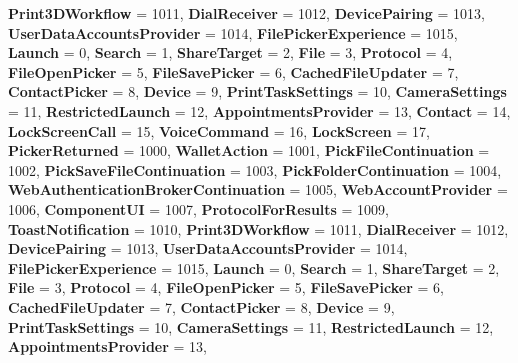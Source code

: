 \begin{DoxyCompactItemize}
\newline
{\bfseries Print3\+D\+Workflow} = 1011, 
{\bfseries Dial\+Receiver} = 1012, 
{\bfseries Device\+Pairing} = 1013, 
{\bfseries User\+Data\+Accounts\+Provider} = 1014, 
\newline
{\bfseries File\+Picker\+Experience} = 1015, 
{\bfseries Launch} = 0, 
{\bfseries Search} = 1, 
{\bfseries Share\+Target} = 2, 
\newline
{\bfseries File} = 3, 
{\bfseries Protocol} = 4, 
{\bfseries File\+Open\+Picker} = 5, 
{\bfseries File\+Save\+Picker} = 6, 
\newline
{\bfseries Cached\+File\+Updater} = 7, 
{\bfseries Contact\+Picker} = 8, 
{\bfseries Device} = 9, 
{\bfseries Print\+Task\+Settings} = 10, 
\newline
{\bfseries Camera\+Settings} = 11, 
{\bfseries Restricted\+Launch} = 12, 
{\bfseries Appointments\+Provider} = 13, 
{\bfseries Contact} = 14, 
\newline
{\bfseries Lock\+Screen\+Call} = 15, 
{\bfseries Voice\+Command} = 16, 
{\bfseries Lock\+Screen} = 17, 
{\bfseries Picker\+Returned} = 1000, 
\newline
{\bfseries Wallet\+Action} = 1001, 
{\bfseries Pick\+File\+Continuation} = 1002, 
{\bfseries Pick\+Save\+File\+Continuation} = 1003, 
{\bfseries Pick\+Folder\+Continuation} = 1004, 
\newline
{\bfseries Web\+Authentication\+Broker\+Continuation} = 1005, 
{\bfseries Web\+Account\+Provider} = 1006, 
{\bfseries Component\+UI} = 1007, 
{\bfseries Protocol\+For\+Results} = 1009, 
\newline
{\bfseries Toast\+Notification} = 1010, 
{\bfseries Print3\+D\+Workflow} = 1011, 
{\bfseries Dial\+Receiver} = 1012, 
{\bfseries Device\+Pairing} = 1013, 
\newline
{\bfseries User\+Data\+Accounts\+Provider} = 1014, 
{\bfseries File\+Picker\+Experience} = 1015, 
{\bfseries Launch} = 0, 
{\bfseries Search} = 1, 
\newline
{\bfseries Share\+Target} = 2, 
{\bfseries File} = 3, 
{\bfseries Protocol} = 4, 
{\bfseries File\+Open\+Picker} = 5, 
\newline
{\bfseries File\+Save\+Picker} = 6, 
{\bfseries Cached\+File\+Updater} = 7, 
{\bfseries Contact\+Picker} = 8, 
{\bfseries Device} = 9, 
\newline
{\bfseries Print\+Task\+Settings} = 10, 
{\bfseries Camera\+Settings} = 11, 
{\bfseries Restricted\+Launch} = 12, 
{\bfseries Appointments\+Provider} = 13, 
\newline

\end{DoxyCompactItemize}
